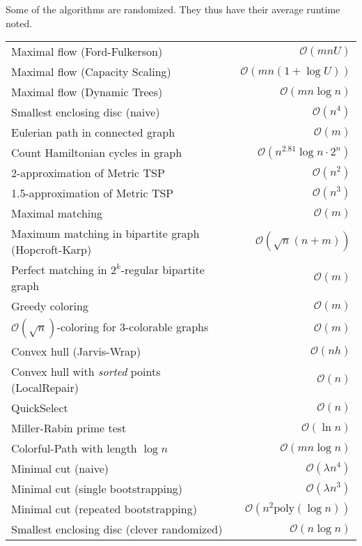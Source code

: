 \documentclass[a4paper,10pt]{article}
\newcommand{\bigO}{\mathcal{O}}
\begin{document}
    Some of the algorithms are randomized. They thus have their average runtime noted.
    \begin{center}
    \begin{tabular}{lr}
        \toprule
        Maximal flow (Ford-Fulkerson) & \(\bigO(mnU)\)\\
        Maximal flow (Capacity Scaling) & \(\bigO(mn(1 + \log U))\) \\
        Maximal flow (Dynamic Trees) & \(\bigO(mn\log n)\) \\
        Smallest enclosing disc (naive) & \(\bigO(n^4)\) \\
        Eulerian path in connected graph & \(\bigO(m)\) \\
        Count Hamiltonian cycles in graph & \(\bigO(n^{2.81}\log n \cdot 2^n)\) \\
        2-approximation of Metric TSP & \(\bigO(n^2)\) \\
        1.5-approximation of Metric TSP & \(\bigO(n^3)\) \\
        Maximal matching & \(\bigO(m)\) \\
        Maximum matching in bipartite graph (Hopcroft-Karp) & \(\bigO(\sqrt{n}(n+m))\) \\
        Perfect matching in \(2^k\)-regular bipartite graph & \(\bigO(m)\) \\
        Greedy coloring & \(\bigO(m)\) \\
        \(\bigO(\sqrt{n})\)-coloring for 3-colorable graphs & \(\bigO(m)\) \\
        Convex hull (Jarvis-Wrap) & \(\bigO(nh)\) \\
        Convex hull with \textit{sorted} points (LocalRepair) & \(\bigO(n)\) \\
        QuickSelect & \(\bigO(n)\) \\
        Miller-Rabin prime test & \(\bigO(\ln n)\) \\
        Colorful-Path with length \(\log n\) & \(\bigO(mn \log n)\) \\
        Minimal cut (naive) & \(\bigO(\lambda n^4)\) \\
        Minimal cut (single bootstrapping) & \(\bigO(\lambda n^3)\) \\
        Minimal cut (repeated bootstrapping) & \(\bigO(n^2\text{poly}(\log n))\) \\
        Smallest enclosing disc (clever randomized) & \(\bigO(n \log n)\) \\
        \bottomrule
    \end{tabular}
    \end{center}
\end{document}
